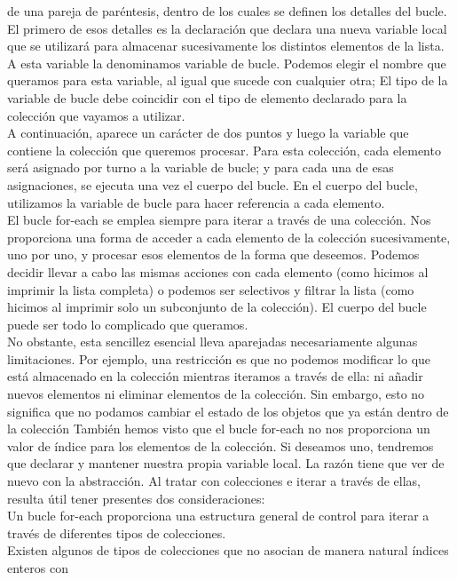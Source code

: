\documentclass[11pt,a4paper]{article}
\begin{document}
	de una pareja de paréntesis, dentro de los cuales se definen los detalles del bucle. El primero de
	esos detalles es la declaración
	que declara una nueva variable local que se utilizará para almacenar sucesivamente los distintos elementos de la lista. A esta variable
	la denominamos variable de bucle. Podemos elegir el nombre que queramos para esta variable,
	al igual que sucede con cualquier otra; El tipo de la
	variable de bucle debe coincidir con el tipo de elemento declarado para la colección que vayamos
	a utilizar.\\
	A continuación, aparece un carácter de dos puntos y luego la variable que contiene la colección
	que queremos procesar. Para esta colección, cada elemento será asignado por turno a la variable de
	bucle; y para cada una de esas asignaciones, se ejecuta una vez el cuerpo del bucle. En el cuerpo
	del bucle, utilizamos la variable de bucle para hacer referencia a cada elemento. \\
	El bucle for-each se emplea siempre para iterar a través de una colección. Nos proporciona una
	forma de acceder a cada elemento de la colección sucesivamente, uno por uno, y procesar esos
	elementos de la forma que deseemos. Podemos decidir llevar a cabo las mismas acciones con cada elemento (como hicimos al imprimir la lista completa) o podemos ser selectivos y filtrar la lista
	(como hicimos al imprimir solo un subconjunto de la colección). El cuerpo del bucle puede ser
	todo lo complicado que queramos.\\
	No obstante, esta sencillez esencial lleva aparejadas necesariamente algunas limitaciones. Por
	ejemplo, una restricción es que no podemos modificar lo que está almacenado en la colección
	mientras iteramos a través de ella: ni añadir nuevos elementos ni eliminar elementos de la colección.
	Sin embargo, esto no significa que no podamos cambiar el estado de los objetos que ya están
	dentro de la colección También hemos visto que el bucle for-each no nos proporciona un valor de índice para los elementos
	de la colección. Si deseamos uno, tendremos que declarar y mantener nuestra propia variable
	local. La razón tiene que ver de nuevo con la abstracción. Al tratar con colecciones e iterar a través
	de ellas, resulta útil tener presentes dos consideraciones:\\
	Un bucle for-each proporciona una estructura general de control para iterar a través de diferentes
	tipos de colecciones.\\
	Existen algunos de tipos de colecciones que no asocian de manera natural índices enteros con
\end{document}
